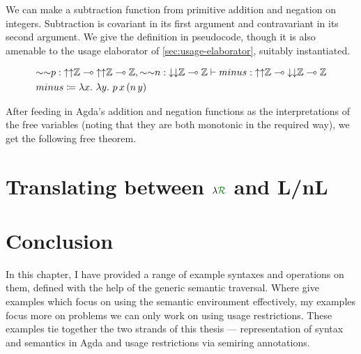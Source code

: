 \begin{example}\label{thm:minus}
  We can make a subtraction function from primitive addition and negation on
  integers.
  Subtraction is covariant in its first argument and contravariant in its
  second argument.
  We give the definition in pseudocode, though it is also amenable to the
  usage elaborator of \cref{sec:usage-elaborator}, suitably instantiated.

  \begin{align*}
    &{\sim\sim}p :
      {\uparrow\uparrow}\mathbb Z \multimap
      {\uparrow\uparrow}\mathbb Z \multimap \mathbb Z,
      {\sim\sim}n : {\downarrow\downarrow}\mathbb Z \multimap \mathbb Z
      \vdash \mathnormal{minus} :
      {\uparrow\uparrow}\mathbb Z \multimap
      {\downarrow\downarrow}\mathbb Z \multimap
      \mathbb Z
    \\
    &\mathnormal{minus} \coloneqq \lambda x.~\lambda y.~p\,x\,(n\,y)
  \end{align*}

  After feeding in Agda's addition and negation functions as the
  interpretations of the free variables (noting that they are both monotonic
  in the required way), we get the following free theorem.





\end{example}

\section{Translating between $\name$ and L/nL}\label{sec:lnl}


\section{Conclusion}

In this chapter, I have provided a range of example syntaxes and operations on
them, defined with the help of the generic semantic traversal.
Where \citet{AACMM21} give examples which focus on using the semantic
environment effectively, my examples focus more on problems we can only work on
using usage restrictions.
These examples tie together the two strands of this thesis --- representation of
syntax and semantics in Agda and usage restrictions via semiring annotations.

